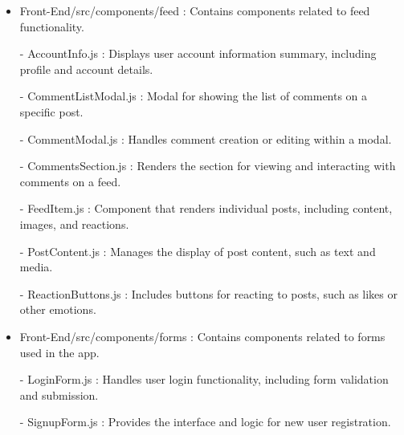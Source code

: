\begin{itemize}
                    \item Front-End/src/components/feed : Contains components related to feed functionality.
                        \item[-] AccountInfo.js : Displays user account information summary, including profile and account details.
                        \item[-] CommentListModal.js : Modal for showing the list of comments on a specific post.
                        \item[-] CommentModal.js : Handles comment creation or editing within a modal.
                        \item[-] CommentsSection.js : Renders the section for viewing and interacting with comments on a feed.
                        \item[-] FeedItem.js : Component that renders individual posts, including content, images, and reactions.
                        \item[-] PostContent.js : Manages the display of post content, such as text and media.
                        \item[-] ReactionButtons.js : Includes buttons for reacting to posts, such as likes or other emotions.
                    \vspace{3mm}
                
                    \item Front-End/src/components/forms : Contains components related to forms used in the app.
                        \item[-] LoginForm.js : Handles user login functionality, including form validation and submission.
                        \item[-] SignupForm.js : Provides the interface and logic for new user registration.
                    \vspace{3mm}
                

\end{itemize}
